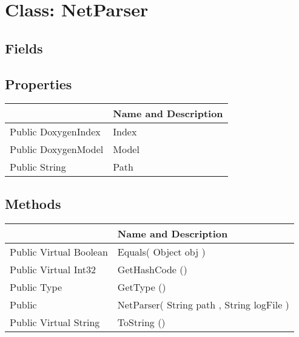 \documentclass[11pt, oneside, a4paper]{book}
\begin{document}
\hypertarget{SoftwareEngineeringTools.{}Documentation.{}NetParser}{}
\section{Class: NetParser}

\subsection{Fields}

\subsection{Properties}
\begin{center}
\begin{tabular}{| p{3cm} | p{12cm} | }
\hline
\textbf{ } & \textbf{ Name and Description}\\
\hline
 Public  DoxygenIndex &  Index\hypertarget{SoftwareEngineeringTools.{}Documentation.{}NetParser.{}Index}{}\\
\hline
 Public  DoxygenModel &  Model\hypertarget{SoftwareEngineeringTools.{}Documentation.{}NetParser.{}Model}{}\\
\hline
 Public  String &  Path\hypertarget{SoftwareEngineeringTools.{}Documentation.{}NetParser.{}Path}{}\\
\hline
\end{tabular}
\end{center}

\subsection{Methods}
\begin{center}
\begin{tabular}{| p{3cm} | p{12cm} | }
\hline
\textbf{ } & \textbf{ Name and Description}\\
\hline
 Public  Virtual  Boolean &  Equals(\hypertarget{SoftwareEngineeringTools.{}Documentation.{}NetParser.{}Equals\_Object}{} Object  obj  )\\
\hline
 Public  Virtual  Int32 &  GetHashCode ()\hypertarget{SoftwareEngineeringTools.{}Documentation.{}NetParser.{}GetHashCode}{}\\
\hline
 Public  Type &  GetType ()\hypertarget{SoftwareEngineeringTools.{}Documentation.{}NetParser.{}GetType}{}\\
\hline
 Public  &  NetParser(\hypertarget{SoftwareEngineeringTools.{}Documentation.{}NetParser.{}NetParser\_String\_String}{} String  path  ,  String  logFile  )\\
\hline
 Public  Virtual  String &  ToString ()\hypertarget{SoftwareEngineeringTools.{}Documentation.{}NetParser.{}ToString}{}\\
\hline
\end{tabular}
\end{center}
 
\end{document}
